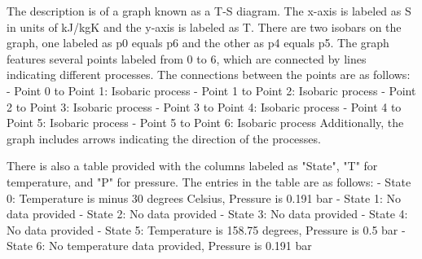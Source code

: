 The description is of a graph known as a T-S diagram. The x-axis is labeled as S in units of kJ/kgK and the y-axis is labeled as T. There are two isobars on the graph, one labeled as p0 equals p6 and the other as p4 equals p5. The graph features several points labeled from 0 to 6, which are connected by lines indicating different processes. The connections between the points are as follows:
- Point 0 to Point 1: Isobaric process
- Point 1 to Point 2: Isobaric process
- Point 2 to Point 3: Isobaric process
- Point 3 to Point 4: Isobaric process
- Point 4 to Point 5: Isobaric process
- Point 5 to Point 6: Isobaric process
Additionally, the graph includes arrows indicating the direction of the processes.

There is also a table provided with the columns labeled as "State", "T" for temperature, and "P" for pressure. The entries in the table are as follows:
- State 0: Temperature is minus 30 degrees Celsius, Pressure is 0.191 bar
- State 1: No data provided
- State 2: No data provided
- State 3: No data provided
- State 4: No data provided
- State 5: Temperature is 158.75 degrees, Pressure is 0.5 bar
- State 6: No temperature data provided, Pressure is 0.191 bar